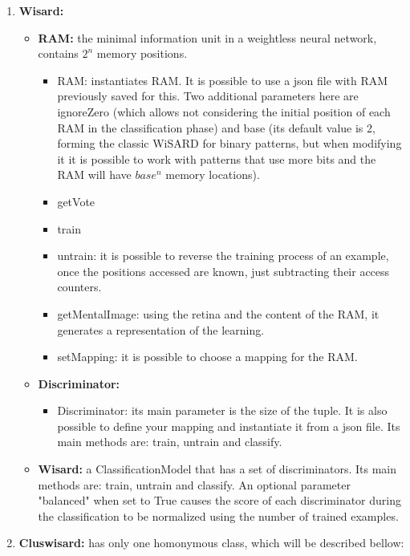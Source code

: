 \documentclass[12pt]{article}
\begin{document}
\begin{enumerate}
    \item \textbf{Wisard:}
          \begin{itemize}
              \item \textbf{RAM:} the minimal information unit in a weightless neural network, contains $2^{n}$ memory positions.
                    \begin{itemize}
                        \item RAM: instantiates RAM. It is possible to use a json file with RAM previously saved for this. Two additional parameters here are ignoreZero (which allows not considering the initial position of each RAM in the classification phase) and base (its default value is 2, forming the classic WiSARD for binary patterns, but when modifying it it is possible to work with patterns that use more bits and the RAM will have $base^{n}$ memory locations).
                        \item getVote
                        \item train
                        \item untrain: it is possible to reverse the training process of an example, once the positions accessed are known, just subtracting their access counters.
                        \item getMentalImage: using the retina and the content of the RAM, it generates a representation of the learning.
                        \item setMapping: it is possible to choose a mapping for the RAM.
                    \end{itemize}
              \item \textbf{Discriminator:}
                    \begin{itemize}
                        \item Discriminator: its main parameter is the size of the tuple. It is also possible to define your mapping and instantiate it from a json file. Its main methods are: train, untrain and classify.
                    \end{itemize}
              \item \textbf{Wisard:} a ClassificationModel that has a set of discriminators. Its main methods are: train, untrain and classify. An optional parameter "balanced" when set to True causes the score of each discriminator during the classification to be normalized using the number of trained examples.
          \end{itemize}
    \item \textbf{Cluswisard:} has only one homonymous class, which will be described bellow:

\end{enumerate}
\end{document}
